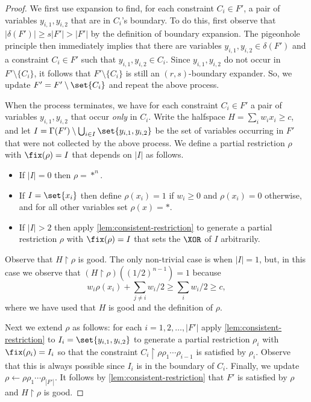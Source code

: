 \documentclass[11pt]{article}
\begin{document}
\begin{proof}
	We first use expansion to find, for each constraint $C_i \in F'$, a pair of variables $y_{i,1}, y_{i,2}$ that are in $C_i$'s boundary. To do this, first observe that $|\delta(F')| \geq s |F'| > |F'|$ by the definition of boundary expansion.
	The pigeonhole principle then immediately implies that there are variables $y_{i,1}, y_{i,2} \in \delta(F')$ and a constraint $C_i \in F'$ such that $y_{i,1}, y_{i,2} \in C_i$. 
	Since $y_{i,1},y_{i,2}$ do not occur in $F' \setminus \{C_i\}$, it follows that $F' \setminus \{C_i\}$ is still an $(r, s)$-boundary expander. 
	So, we update $F' = F' \setminus \set{C_i}$ and repeat the above process.

	When the process terminates, we have for each constraint $C_i \in F'$ a pair of variables $y_{i,1}, y_{i,2}$ that occur \emph{only} in $C_i$.
	Write the halfspace $H = \sum_{i} w_i x_i \geq c$, and let $I = \Gamma(F') \setminus \bigcup_{i \in I} \set{y_{i,1}, y_{i,2}}$ be the set of variables occurring in $F'$ that were not collected by the above process.
	We define a partial restriction $\rho$ with $\fix(\rho) = I$ that depends on $|I|$ as follows.	
	\begin{itemize}
		\item If $|I| = 0$ then $\rho = *^n$.
		\item If $I = \set{x_i}$ then define $\rho(x_i) = 1$ if $w_i \geq 0$ and $\rho(x_i) = 0$ otherwise, and for all other variables set $\rho(x) = *$.
		\item If $|I| > 2$ then apply \autoref{lem:consistent-restriction} to generate a partial restriction $\rho$ with $\fix(\rho) = I$ that sets the $\XOR$ of $I$ arbitrarily.
	\end{itemize}
	Observe that $H \restriction \rho$ is good.
	The only non-trivial case is when $|I| = 1$, but, in this case we observe that $(H \restriction \rho)((1/2)^{n-1}) = 1$ because  
	 \[ w_i \rho(x_i) + \sum_{j \neq i} w_i/2 \geq \sum_{i} w_i/2 \geq c,\]
	where we have used that $H$ is good and the definition of $\rho$.

	Next we extend $\rho$ as follows: for each $i = 1, 2, \ldots, |F'|$ apply \autoref{lem:consistent-restriction} to $I_i = \set{y_{i,1}, y_{i,2}}$ to generate a partial restriction $\rho_i$ with $\fix(\rho_i) = I_i$ so that the constraint $C_i \restriction \rho \rho_1 \cdots \rho_{i-1}$ is satisfied by $\rho_i$.
	Observe that this is always possible since $I_i$ is in the boundary of $C_i$.
	Finally, we update $\rho \leftarrow \rho \rho_1 \cdots \rho_{|F'|}$.
	It follows by \autoref{lem:consistent-restriction} that $F'$ is satisfied by $\rho$ and $H \restriction \rho$ is good.
\end{proof}
\end{document}
